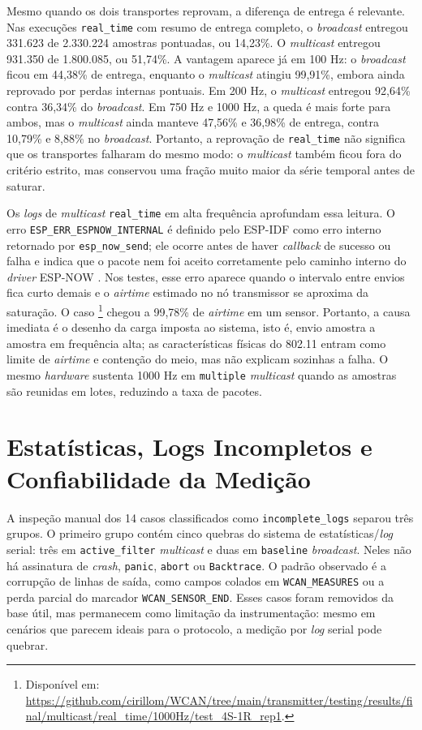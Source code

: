 Mesmo quando os dois transportes reprovam, a diferença de entrega é relevante.
Nas execuções \texttt{real\_time} com resumo de entrega completo, o \emph{broadcast}
entregou 331.623 de 2.330.224 amostras pontuadas, ou 14,23\%. O \emph{multicast}
entregou 931.350 de 1.800.085, ou 51,74\%. A vantagem aparece já em 100 Hz:
o \emph{broadcast} ficou em 44,38\% de entrega, enquanto o \emph{multicast} atingiu
99,91\%, embora ainda reprovado por perdas internas pontuais. Em 200 Hz, o
\emph{multicast} entregou 92,64\% contra 36,34\% do \emph{broadcast}. Em 750 Hz e 1000 Hz, a
queda é mais forte para ambos, mas o \emph{multicast} ainda manteve 47,56\% e 36,98\%
de entrega, contra 10,79\% e 8,88\% no \emph{broadcast}. Portanto, a reprovação de
\texttt{real\_time} não significa que os transportes falharam do mesmo modo: o
\emph{multicast} também ficou fora do critério estrito, mas conservou uma fração muito
maior da série temporal antes de saturar.

Os \emph{logs} de \emph{multicast} \texttt{real\_time} em alta frequência aprofundam essa
leitura. O erro \texttt{ESP\_ERR\_ESPNOW\_INTERNAL} é definido pelo ESP-IDF como
erro interno retornado por \texttt{esp\_now\_send}; ele ocorre antes de haver
\emph{callback} de sucesso ou falha e indica que o pacote nem foi aceito corretamente
pelo caminho interno do \emph{driver} ESP-NOW \cite{espressif_espnow_programming_guide}.
Nos testes, esse erro aparece quando o intervalo entre envios fica curto demais e
o \emph{airtime} estimado no nó transmissor se aproxima da saturação. O caso
\footnote{Disponível em: \url{https://github.com/cirillom/WCAN/tree/main/transmitter/testing/results/final/multicast/real_time/1000Hz/test_4S-1R_rep1}.} chegou a 99,78\% de \emph{airtime} em
um sensor. Portanto, a causa imediata é o desenho da carga imposta ao sistema,
isto é, envio amostra a amostra em frequência alta; as características físicas do
802.11 entram como limite de \emph{airtime} e contenção do meio, mas não explicam
sozinhas a falha. O mesmo \emph{hardware} sustenta 1000 Hz em \texttt{multiple}
\emph{multicast} quando as amostras são reunidas em lotes, reduzindo a taxa de pacotes.

\section{Estatísticas, Logs Incompletos e Confiabilidade da Medição}

A inspeção manual dos 14 casos classificados como \texttt{incomplete\_logs}
separou três grupos. O primeiro grupo contém cinco quebras do sistema de
estatísticas/\emph{log} serial: três em \texttt{active\_filter} \emph{multicast} e duas em
\texttt{baseline} \emph{broadcast}. Neles não há assinatura de \emph{crash}, \texttt{panic},
\texttt{abort} ou \texttt{Backtrace}. O padrão observado é a corrupção de linhas
de saída, como campos colados em \texttt{WCAN\_MEASURES} ou a perda parcial do
marcador \texttt{WCAN\_SENSOR\_END}. Esses casos foram removidos da base útil,
mas permanecem como limitação da instrumentação: mesmo em cenários que parecem
ideais para o protocolo, a medição por \emph{log} serial pode quebrar.

